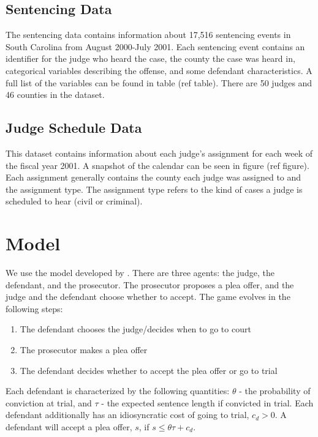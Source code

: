 \documentclass[11pt]{article}
\begin{document}
  \subsection{Sentencing Data}
    The sentencing data contains information about 17,516 sentencing events in South Carolina from August 2000-July 2001. Each sentencing event contains an identifier for the judge who heard the case, the county the case was heard in, categorical variables describing the offense, and some defendant characteristics. A full list of the variables can be found in table (ref table). There are 50 judges and 46 counties in the dataset.

  \subsection{Judge Schedule Data}
    This dataset contains information about each judge's assignment for each week of the fiscal year 2001. A snapshot of the calendar can be seen in figure (ref figure). Each assignment generally contains the county each judge was assigned to and the assignment type. The assignment type refers to the kind of cases a judge is scheduled to hear (civil or criminal).

\section{Model}
  We use the model developed by . There are three agents: the judge, the defendant, and the prosecutor. The prosecutor proposes a plea offer, and the judge and the defendant choose whether to accept. The game evolves in the following steps:

  \begin{enumerate}
    \item The defendant chooses the judge/decides when to go to court
    \item The prosecutor makes a plea offer
    \item The defendant decides whether to accept the plea offer or go to trial
  \end{enumerate}

Each defendant is characterized by the following quantities: $\theta$ - the probability of conviction at trial, and $\tau$ - the expected sentence length if convicted in trial. Each defendant additionally has an idiosyncratic cost of going to trial, $c_d >0$. A defendant will accept a plea offer, $s$, if $s \leq \theta \tau + c_d$.\\
\end{document}
